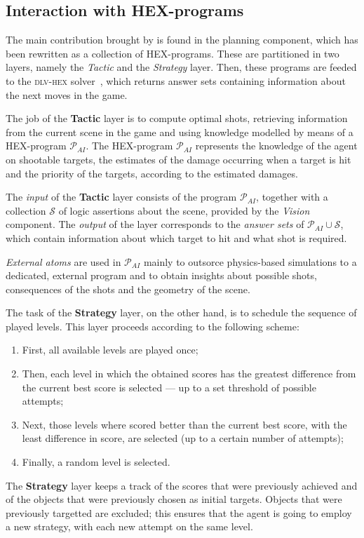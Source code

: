 \subsection{Interaction with HEX-programs}

The main contribution brought by \ah is
found in the planning component, which has
been rewritten as a collection of HEX-programs.
These are partitioned in two layers, namely
the \emph{Tactic} and the \emph{Strategy} layer.
Then, these programs are feeded to the
\textsc{dlv-hex} solver~\cite{dlvHEX},
which returns answer sets containing
information about the next moves in the game.

The job of the \textbf{Tactic} layer is to compute optimal shots, retrieving information from the current scene in the game and using knowledge modelled by means of a HEX-program \(\mathcal{P}_{AI}\).
The HEX-program \(\mathcal{P}_{AI}\) represents the knowledge of the agent on shootable targets, the estimates of the damage occurring when a target is hit and the priority of the targets, according to the estimated damages.

The \emph{input} of the \textbf{Tactic} layer consists of the program \(\mathcal{P}_{AI}\), together with a collection \(\mathcal{S}\) of logic assertions about the scene, provided by the \emph{Vision} component.
The \emph{output} of the layer corresponds to the \emph{answer sets} of \(\mathcal{P}_{AI} \cup \mathcal{S}\), which contain information about which target to hit and what shot is required.

\emph{External atoms} are used in \(\mathcal{P}_{AI}\) mainly to outsorce physics-based simulations to a dedicated, external program and to obtain insights about possible shots, consequences of the shots and the geometry of the scene.

The task of the \textbf{Strategy} layer, on the other hand, is to schedule the sequence of played levels. This layer proceeds according to the following scheme:
\begin{enumerate}
    \item First, all available levels are played once;
    \item Then, each level in which the obtained scores has the greatest difference from the current best score is selected --- up to a set threshold of possible attempts;
    \item Next, those levels where \ah scored better than the current best score, with the least difference in score, are selected (up to a certain number of attempts);
    \item Finally, a random level is selected. 
\end{enumerate}

The \textbf{Strategy} layer keeps a track of the scores that were previously achieved and of the objects that were previously chosen as initial targets.
Objects that were previously targetted are excluded; this ensures that the agent is going to employ a new strategy, with each new attempt on the same level.